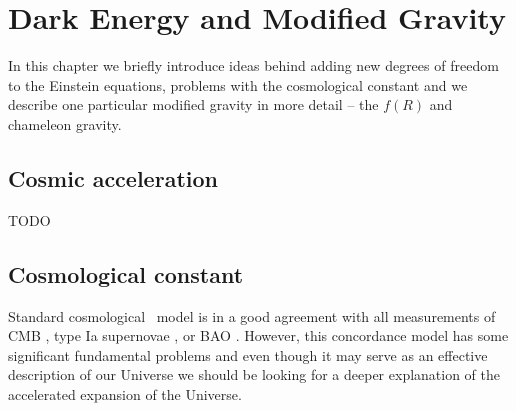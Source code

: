\chapter{Dark Energy and Modified Gravity}
In this chapter we briefly introduce ideas behind adding new degrees of freedom to the Einstein equations, problems with the cosmological constant and we describe one particular modified gravity in more detail -- the $f(R)$ and chameleon gravity.
\section{Cosmic acceleration}
TODO

\section{Cosmological constant}
Standard cosmological \LCDM\ model is in a good agreement with all measurements of CMB \parencite{planck_cosm}, type Ia supernovae \parencite{Abbott_2019}, or BAO \parencite{BAO_results}. However, this concordance model has some significant fundamental problems and even though it may serve as an effective description of our Universe we should be looking for a deeper explanation of the accelerated expansion of the Universe.
